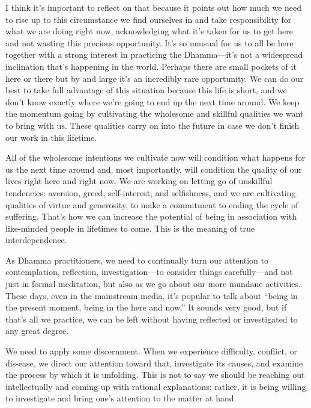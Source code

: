 I think it's important to reflect on that because it points out how 
much we need to rise up to this circumstance we find ourselves in and 
take responsibility for what we are doing right now, acknowledging what 
it's taken for us to get here and not wasting this precious 
opportunity. It's so unusual for us to all be here together with a 
strong interest in practicing the Dhamma---it's not a widespread 
inclination that's happening in the world. Perhaps there are small 
pockets of it here or there but by and large it's an incredibly rare 
opportunity. We can do our best to take full advantage of this 
situation because this life is short, and we don't know exactly where 
we're going to end up the next time around. We keep the momentum going 
by cultivating the wholesome and skillful qualities we want to bring 
with us. These qualities carry on into the future in case we don't 
finish our work in this lifetime.

All of the wholesome intentions we cultivate now will condition what 
happens for us the next time around and, most importantly, will 
condition the quality of our lives right here and right now. We are 
working on letting go of unskillful tendencies: aversion, greed, 
self-interest, and selfishness, and we are cultivating qualities of 
virtue and generosity, to make a commitment to ending the cycle of 
suffering. That's how we can increase the potential of being in 
association with like-minded people in lifetimes to come. This is the 
meaning of true interdependence.


As Dhamma practitioners, we need to continually turn our attention to 
contemplation, reflection, investigation---to consider things 
carefully---and not just in formal meditation, but also as we go about 
our more mundane activities. These days, even in the mainstream media, 
it's popular to talk about ``being in the present moment, being in the 
here and now.'' It sounds very good, but if that's all we practice, we 
can be left without having reflected or investigated to any great 
degree.

We need to apply some discernment. When we experience difficulty, 
conflict, or dis-ease, we direct our attention toward that, investigate 
its causes, and examine the process by which it is unfolding. This is 
not to say we should be reaching out intellectually and coming up with 
rational explanations; rather, it is being willing to investigate and 
bring one's attention to the matter at hand.

